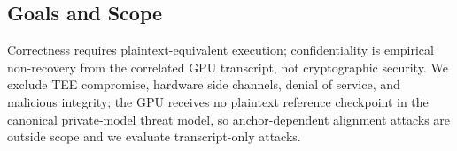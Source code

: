 \subsection{Goals and Scope}
\label{subsec:objectives}

Correctness requires plaintext-equivalent execution; confidentiality is
empirical non-recovery from the correlated GPU transcript, not cryptographic
security. We exclude TEE compromise, hardware side channels, denial of service,
and malicious integrity; the GPU receives no plaintext reference checkpoint in
the canonical private-model threat model, so anchor-dependent alignment attacks
are outside scope and we evaluate transcript-only attacks.
